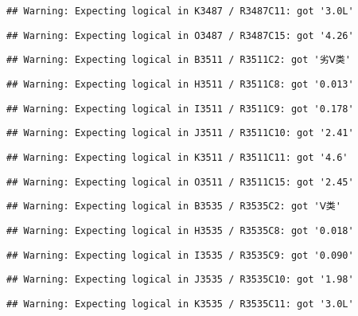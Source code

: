\documentclass[
]{article}
\begin{document}
\begin{verbatim}
## Warning: Expecting logical in K3487 / R3487C11: got '3.0L'
\end{verbatim}

\begin{verbatim}
## Warning: Expecting logical in O3487 / R3487C15: got '4.26'
\end{verbatim}

\begin{verbatim}
## Warning: Expecting logical in B3511 / R3511C2: got '劣Ⅴ类'
\end{verbatim}

\begin{verbatim}
## Warning: Expecting logical in H3511 / R3511C8: got '0.013'
\end{verbatim}

\begin{verbatim}
## Warning: Expecting logical in I3511 / R3511C9: got '0.178'
\end{verbatim}

\begin{verbatim}
## Warning: Expecting logical in J3511 / R3511C10: got '2.41'
\end{verbatim}

\begin{verbatim}
## Warning: Expecting logical in K3511 / R3511C11: got '4.6'
\end{verbatim}

\begin{verbatim}
## Warning: Expecting logical in O3511 / R3511C15: got '2.45'
\end{verbatim}

\begin{verbatim}
## Warning: Expecting logical in B3535 / R3535C2: got 'Ⅴ类'
\end{verbatim}

\begin{verbatim}
## Warning: Expecting logical in H3535 / R3535C8: got '0.018'
\end{verbatim}

\begin{verbatim}
## Warning: Expecting logical in I3535 / R3535C9: got '0.090'
\end{verbatim}

\begin{verbatim}
## Warning: Expecting logical in J3535 / R3535C10: got '1.98'
\end{verbatim}

\begin{verbatim}
## Warning: Expecting logical in K3535 / R3535C11: got '3.0L'
\end{verbatim}
\end{document}
